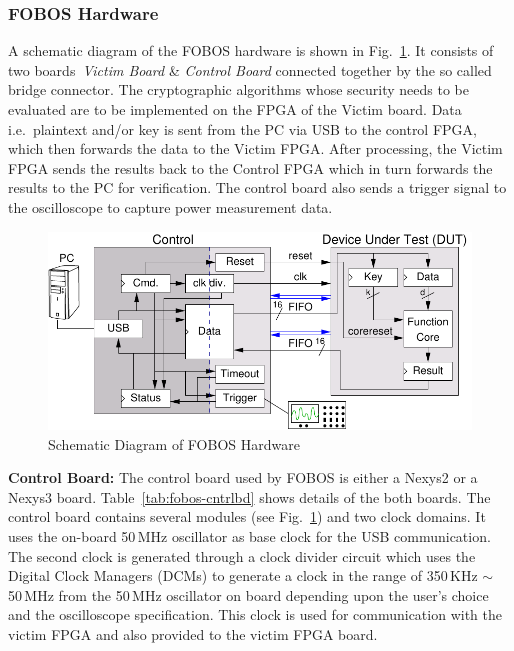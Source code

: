 \documentclass{llncs}
\numberwithin{algorithm}{chapter}
\begin{document}
\subsubsection{FOBOS Hardware}
A schematic diagram of the FOBOS 
hardware is shown in Fig.~\ref{fig:fobos-block}. It consists of
two boards~\textit{Victim Board} \& \textit{Control Board} connected together by 
the so called bridge connector.
The cryptographic algorithms whose security needs to be evaluated are to be implemented on 
the FPGA of the Victim board. Data i.e.\ plaintext and/or key is sent from the PC 
via USB to the control FPGA, which then forwards the data to the Victim FPGA. After 
processing, the Victim FPGA sends the results back to the Control FPGA which in turn 
forwards the results to the PC for verification. The control board also sends a 
trigger signal to the oscilloscope to capture power measurement data. 
%
\begin{figure}[t]
\begin{center}
\includegraphics[scale=0.8]{figures/fobos-block}
\caption{Schematic Diagram of FOBOS Hardware}\label{fig:fobos-block}
\end{center} 
\end{figure}
%


\textbf{Control Board:}
The control board used by FOBOS is either a Nexys2 or a Nexys3 board.  
Table~\ref{tab:fobos-cntrlbd} shows details of the both boards. 
The control board contains
several modules (see Fig.~\ref{fig:fobos-block}) and two clock domains.
It uses the on-board 50\,MHz oscillator as base clock for the USB communication.
The second clock is generated through a clock divider circuit which uses
the Digital Clock Managers (DCMs) to generate a clock in the range of 
350\,KHz $\sim$ 50\,MHz from the 50\,MHz oscillator on board depending upon the user's choice and the 
oscilloscope specification.  This clock is used for communication with the victim FPGA 
and also provided to the victim FPGA board.
\end{document}
